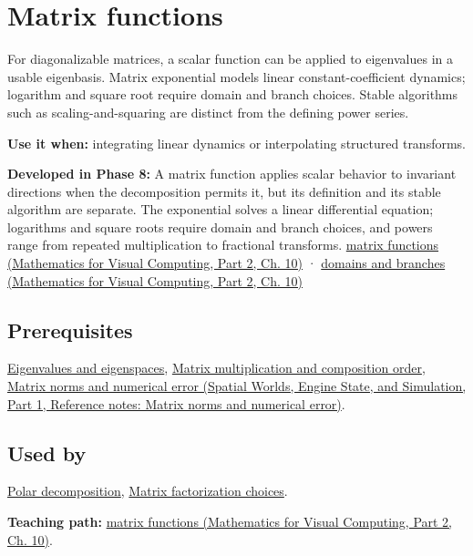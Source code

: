 \hypertarget{appendix-0f4bc2bf2b1f}{}\label{referencestart:appendix-0f4bc2bf2b1f}
\section{Matrix functions}\label{appendix-0f4bc2bf2b1f-matrix-functions}

\hypertarget{appendix-0f4bc2bf2b1f-matrix-functions}{}

For diagonalizable matrices, a scalar function can be applied to eigenvalues in a usable eigenbasis. Matrix exponential models linear constant-coefficient dynamics; logarithm and square root require domain and branch choices. Stable algorithms such as scaling-and-squaring are distinct from the defining power series.

\textbf{Use it when:} integrating linear dynamics or interpolating structured transforms.

\textbf{Developed in Phase 8:} A matrix function applies scalar behavior to invariant directions when the decomposition permits it, but its definition and its stable algorithm are separate. The exponential solves a linear differential equation; logarithms and square roots require domain and branch choices, and powers range from repeated multiplication to fractional transforms. \href{../02-Mathematics-for-Visual-Computing-P02/main.pdf\#nameddest=02-foundations-ii-ch026-matrix-functions-turn-repeated-linear-actions-into-one-operator}{matrix functions (Mathematics for Visual Computing, Part 2, Ch. 10)} · \href{../02-Mathematics-for-Visual-Computing-P02/main.pdf\#nameddest=02-foundations-ii-ch026-logarithms-and-square-roots-need-domains-and-branches}{domains and branches (Mathematics for Visual Computing, Part 2, Ch. 10)}

\subsection{Prerequisites}\label{appendix-0f4bc2bf2b1f-prerequisites}

\hypertarget{appendix-0f4bc2bf2b1f-prerequisites}{}

\hyperref[appendix-0b3be18411f9]{Eigenvalues and eigenspaces}, \hyperref[appendix-ab31ef447dbf]{Matrix multiplication and composition order}, \href{../05-Spatial-Worlds-Engine-State-and-Simulation-P01/main.pdf\#nameddest=appendix-f8657bac66e5}{Matrix norms and numerical error (Spatial Worlds, Engine State, and Simulation, Part 1, Reference notes: Matrix norms and numerical error)}.

\subsection{Used by}\label{appendix-0f4bc2bf2b1f-used-by}

\hypertarget{appendix-0f4bc2bf2b1f-used-by}{}

\hyperref[appendix-73f5bcf7a462]{Polar decomposition}, \hyperref[appendix-221a483bec2d]{Matrix factorization choices}.

\textbf{Teaching path:} \href{../02-Mathematics-for-Visual-Computing-P02/main.pdf\#nameddest=02-foundations-ii-ch026-matrix-functions-turn-repeated-linear-actions-into-one-operator}{matrix functions (Mathematics for Visual Computing, Part 2, Ch. 10)}.
